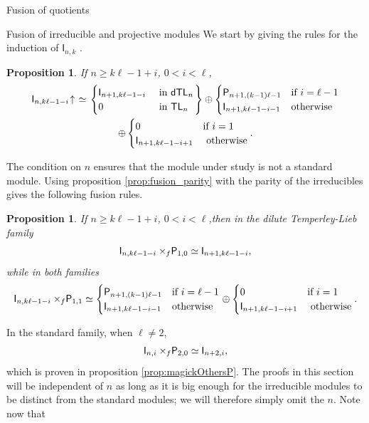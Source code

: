 \documentclass[reqno]{amsart}
\newtheorem{Prop}[Thm]{Proposition}
\newcommand{\dtl}[1]{\mathsf{dTL}_{#1}}
\newcommand{\tl}[1]{\mathsf{TL}_{#1}}
\newcommand{\dl}[1]{\mathsf I_{#1}}
\newcommand{\dP}[1]{\mathsf P_{#1}}
\newcommand{\xf}{\times\hspace{-0.27em}_f}
\newcommand{\lc}{\ell}
\newcommand{\Ind}[1]{#1{}\hspace{-0.18em} \uparrow{}\hskip -0.18em}
\begin{document}
\begin{section}{Fusion of quotients}
\begin{subsection}{Fusion of irreducible and projective modules}\label{sec:fusionIvsP}
We start by giving the rules for the induction of $\dl{n,k}$ \cite{BelSY}.
\begin{Prop}
If $n\geq k \lc- 1+i$, $0<i<\lc$,
\begin{multline}
\Ind{\dl{n,k \lc -1 -i}} \simeq \left. \begin{cases}
\dl{n+1,k \lc -1 -i}& \text{ in } \dtl{n} \\
0 & \text{ in } \tl{n}
\end{cases}\right\} \oplus \begin{cases}
\dP{n+1, (k-1) \lc -1} & \text{if } i =\lc-1\\
\dl{n+1,k\lc -1 -i-1} & \text{otherwise}
\end{cases}\\
\oplus \begin{cases}
0 & \text{if } i=1\\
\dl{n+1,k \lc -1 - i +1} & \text{ otherwise}\\
\end{cases}.
\end{multline}
\end{Prop}
\noindent The condition on $n$ ensures that the module under study is not a standard module. Using proposition \ref{prop:fusion_parity} with the parity of the irreducibles gives the following fusion rules.
\begin{Prop}\label{prop:fusionIvs01}
If $n\geq k \lc- 1+i$, $0 < i < \lc$,then in the dilute Temperley-Lieb family
\begin{equation}
\dl{n, k \lc -1 -i} \xf \dP{1,0} \simeq \dl{n+1, k \lc -1 -i},
\end{equation}
while in both families
\begin{equation}
\dl{n, k \lc -1 -i} \xf \dP{1,1} \simeq \begin{cases}
\dP{n+1, (k-1) \lc -1} & \text{if } i =\lc-1\\
\dl{n+1,k\lc -1 -i-1} & \text{otherwise}
\end{cases}
\oplus \begin{cases}
0 & \text{if } i=1\\
\dl{n+1,k \lc -1 - i +1} & \text{ otherwise}\\
\end{cases}.
\end{equation}
\end{Prop}
In the standard family, when $\lc \neq 2$, $$\dl{n,i} \xf \dP{2,0} \simeq \dl{n+2,i}, $$ which is proven in proposition \ref{prop:magickOthersP}. The proofs in this section will be independent of $n$ as long as it is big enough for the irreducible modules to be distinct from the standard modules; we will therefore simply omit the $n$. Note now that

\end{subsection}
\end{section}
\end{document}

